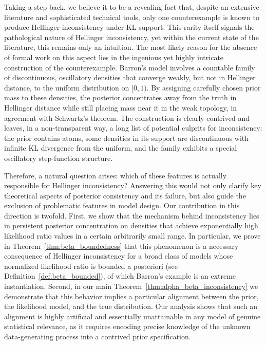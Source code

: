 \documentclass[11pt,twoside]{article}
\begin{document}
Taking a step back, we believe it to be a revealing fact that, despite an extensive literature and sophisticated technical tools, only one counterexample is known to produce Hellinger inconsistency under KL support. This rarity itself signals the pathological nature of Hellinger inconsistency, yet within the current state of the literature, this remains only an intuition. The most likely reason for the absence of formal work on this aspect lies in the ingenious yet highly intricate construction of the counterexample. Barron’s model involves a countable family of discontinuous, oscillatory densities that converge weakly, but not in Hellinger distance, to the uniform distribution on $[0,1)$. By assigning carefully chosen prior mass to these densities, the posterior concentrates away from the truth in Hellinger distance while still placing mass near it in the weak topology, in agreement with Schwartz’s theorem. The construction is clearly contrived and leaves, in a non-transparent way, a long list of potential culprits for inconsistency: the prior contains atoms, some densities in its support are discontinuous with infinite KL divergence from the uniform, and the family exhibits a special oscillatory step-function structure.

Therefore, a natural question arises: which of these features is actually responsible for Hellinger inconsistency? Answering this would not only clarify key theoretical aspects of posterior consistency and its failure, but also guide the exclusion of problematic features in model design. Our contribution in this direction is twofold. First, we show that the mechanism behind inconsistency lies in persistent posterior concentration on densities that achieve exponentially high likelihood ratio values in a certain arbitrarily small range. In particular, we prove in Theorem~\ref{thm:beta_boundedness} that this phenomenon is a necessary consequence of Hellinger inconsistency for a broad class of models whose normalized likelihood ratio is bounded a posteriori (see Definition~\ref{def:beta_bounded}), of which Barron’s example is an extreme instantiation. Second, in our main Theorem~\ref{thm:alpha_beta_inconsistency} we demonstrate that this behavior implies a particular alignment between the prior, the likelihood model, and the true distribution. Our analysis shows that such an alignment is highly artificial and essentially unattainable in any model of genuine statistical relevance, as it requires encoding precise knowledge of the unknown data-generating process into a contrived prior specification.
\end{document}
